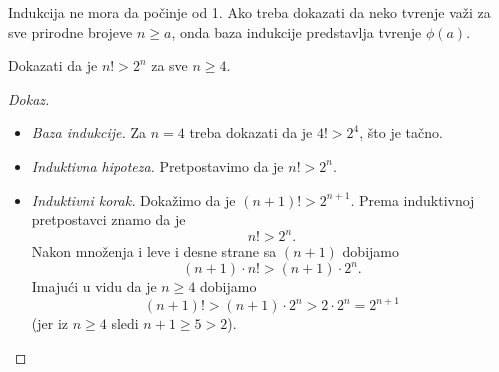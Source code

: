 Indukcija ne mora da po\v cinje od 1. Ako treba dokazati da neko tvr\dj enje va\v zi za sve prirodne brojeve $n \ge a$,
onda baza indukcije predstavlja tvr\dj enje $\phi(a)$.

\begin{EX}
  Dokazati da je $n! > 2^n$ za sve $n \ge 4$.
\end{EX}
\begin{proof}[Dokaz]
  \begin{itemize}
  \item
    \emph{Baza indukcije.} Za $n = 4$ treba dokazati da je $4! > 2^4$, \v sto je ta\v cno.
  
  \item
    \emph{Induktivna hipoteza.} Pretpostavimo da je $n! > 2^n$.
  \item
    \emph{Induktivni korak.} Doka\v zimo da je $(n + 1)! > 2^{n + 1}$. Prema induktivnoj pretpostavci znamo da je
    $$
      n! > 2^n.
    $$
    Nakon mno\v zenja i leve i desne strane sa $(n + 1)$ dobijamo
    $$
      (n + 1) \cdot n! > (n + 1) \cdot 2^n.
    $$
    Imaju\'ci u vidu da je $n \ge 4$ dobijamo
    $$
      (n + 1)! > (n + 1) \cdot 2^n > 2 \cdot 2^n = 2^{n+1}
    $$
    (jer iz $n \ge 4$ sledi $n + 1 \ge 5 > 2$).\qedhere
  \end{itemize}
\end{proof}

